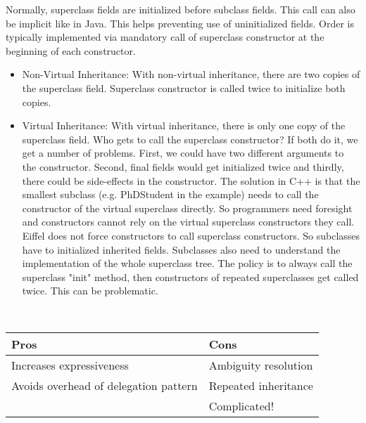 \begin{mytitle} Normally, superclass fields are initialized before subclass fields. This call can also be implicit like in Java. This helps preventing use of uninitialized fields. Order is typically implemented via mandatory call of superclass constructor at the beginning of each constructor. 
\begin{itemize}
    \item Non-Virtual Inheritance: With non-virtual inheritance, there are two copies of the superclass field. Superclass constructor is called twice to initialize both copies. 
    \item Virtual Inheritance: With virtual inheritance, there is only one copy of the superclass field. Who gets to call the superclass constructor? If both do it, we get a number of problems. First, we could have two different arguments to the constructor. Second, final fields would get initialized twice and thirdly, there could be side-effects in the constructor. The solution in C++ is that the smallest subclass (e.g. PhDStudent in the example) needs to call the constructor of the virtual superclass directly. So programmers need foresight and constructors cannot rely on the virtual superclass constructors they call. Eiffel does not force constructors to call superclass constructors. So subclasses have to initialized inherited fields. Subclasses also need to understand the implementation of the whole superclass tree. The policy is to always call the superclass "init" method, then constructors of repeated superclasses get called twice. This can be problematic.
\end{itemize}
\end{mytitle}
\begin{mytitle}[Summary]\hfill\\
\begin{center}
    \begin{tabular}{R{0.4\textwidth}|L{0.4\textwidth}}
       \textbf{Pros}  & \textbf{Cons} \\
       \hline
        Increases expressiveness & Ambiguity resolution\\
        Avoids overhead of delegation pattern & Repeated inheritance\\
         & Complicated!
    \end{tabular}
\end{center}
\end{mytitle}

